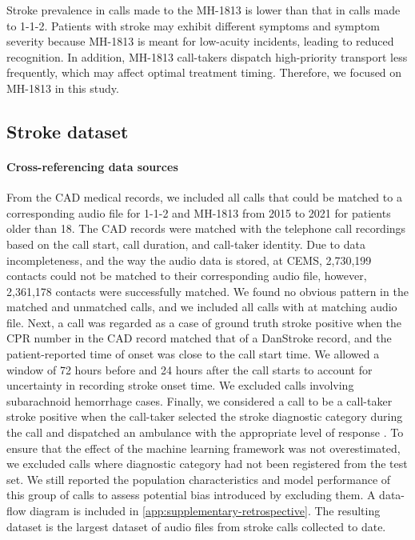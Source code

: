 {Stroke prevalence in calls made to the MH-1813 is lower than that in calls made to 1-1-2. Patients with stroke may exhibit different symptoms and symptom severity because MH-1813 is meant for low-acuity incidents, leading to reduced recognition. In addition, MH-1813 call-takers dispatch high-priority transport less frequently, which may affect optimal treatment timing. Therefore, we focused on MH-1813 in this study.

\subsection{Stroke dataset}

\paragraph{Cross-referencing data sources}

From the CAD medical records, we included all calls that could be matched to a corresponding audio file for 1-1-2 and MH-1813 from 2015 to 2021 for patients older than 18. The CAD records were matched with the telephone call recordings based on the call start, call duration, and call-taker identity. Due to data incompleteness, and the way the audio data is stored, at CEMS, 2,730,199 contacts could not be matched to their corresponding audio file, however, 2,361,178 contacts were successfully matched. We found no obvious pattern in the matched and unmatched calls, and we included all calls with at matching audio file. Next, a call was regarded as a case of ground truth stroke positive when the CPR number in the CAD record matched that of a DanStroke record, and the patient-reported time of onset was close to the call start time. We allowed a window of 72 hours before and 24 hours after the call starts to account for uncertainty in recording stroke onset time. We excluded calls involving subarachnoid hemorrhage cases. Finally, we considered a call to be a call-taker stroke positive when the call-taker selected the stroke diagnostic category during the call and dispatched an ambulance with the appropriate level of response \parencite{cite20}. To ensure that the effect of the machine learning framework was not overestimated, we excluded calls where diagnostic category had not been registered from the test set. We still reported the population characteristics and model performance of this group of calls to assess potential bias introduced by excluding them. A data-flow diagram is included in \cref{app:supplementary-retrospective}. The resulting dataset is the largest dataset of audio files from stroke calls collected to date. 

}
